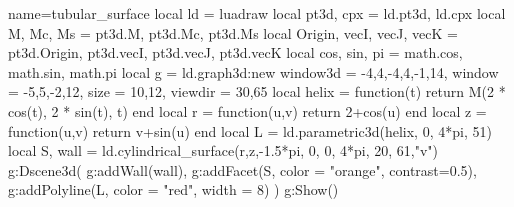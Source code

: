 \documentclass[border=5pt]{standalone}%
\begin{document}
\begin{luadraw}{name=tubular_surface}
    local ld = luadraw
    local pt3d, cpx = ld.pt3d, ld.cpx
    local M, Mc, Ms = pt3d.M, pt3d.Mc, pt3d.Ms
    local Origin, vecI, vecJ, vecK = pt3d.Origin, pt3d.vecI, pt3d.vecJ, pt3d.vecK
    local cos, sin, pi = math.cos, math.sin, math.pi
    local g = ld.graph3d:new{
        window3d = {-4,4,-4,4,-1,14}, window = {-5,5,-2,12},
        size = {10,12}, viewdir = {30,65}
    }
    local helix = function(t)
        return M(2 * cos(t), 2 * sin(t), t)
    end
    local r = function(u,v) return 2+cos(u) end
    local z = function(u,v) return v+sin(u) end
    local L = ld.parametric3d(helix, 0, 4*pi, 51)
    local S, wall = ld.cylindrical_surface(r,z,-1.5*pi, 0, 0, 4*pi, {20, 61},"v")
    g:Dscene3d(
        g:addWall(wall),
        g:addFacet(S, {color = "orange", contrast=0.5}),
        g:addPolyline(L, {color = "red", width = 8})
    )
    g:Show()
\end{luadraw}
\end{document}
